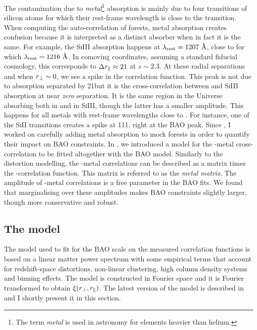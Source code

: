 The contamination due to \emph{metal}\footnote{The term \emph{metal} is used in 
astronomy for elements heavier than helium.} 
absorption is mainly due to four transitions of silicon atoms for which their 
rest-frame wavelength is close to the \lya transition. When computing the 
auto-correlation of forests, metal absorption creates confusion because 
it is interpreted as a distinct \lya absorber when in fact it is the same. 
For example, the \textsc{SiIII} absorption happens at 
$\lambda_\mathrm{rest} = 1207~\angstrom$, close to \lya for which $\lambda_\mathrm{rest} = 1216~\angstrom$. 
In comoving coordinates, assuming a standard fiducial cosmology, this corresponds
to $\Delta {r_\parallel} \approx 21$\hmpc 
at $z \sim 2.3$. At these radial separations and when ${r_\perp} \sim 0$, we see a 
spike in the correlation function. This peak is not due to \lya absorption 
separated by 21\hmpc but it is the cross-correlation between \lya and \textsc{SiIII}
absorption at near \emph{zero} separation. It is the same region in the 
Universe absorbing both in \lya and in \textsc{SiIII}, though the latter 
has a smaller amplitude. This happens for all metals with rest-frame 
wavelengths close to \lya. For instance, one of the \textsc{SiII} transitions 
creates a spike at 111\hmpc, right at the BAO peak. 
Since \cite{delubacBaryonAcousticOscillations2015}, I worked on carefully 
adding metal absorption to mock forests in order to quantify their impact on 
BAO constraints. In \cite{bautistaMeasurementBaryonAcoustic2017}, we introduced 
a model for the \lya-metal cross-correlation to be fitted altogether with the 
BAO model. Similarly to the distortion modelling, the \lya-metal correlations 
can be described as a matrix times the \lya-\lya correlation function. 
This matrix is referred to as the \emph{metal matrix}. The amplitude of 
\lya-metal correlations is a free parameter in the BAO fits. 
We found that marginalising over these amplitudes makes BAO constraints 
slightly larger, though more conservative and robust.   

\subsection{The model}
\label{forests:bao:model}

The model used to fit for the BAO scale on the measured correlation functions 
is based on a linear matter power spectrum with some empirical terms 
that account for redshift-space distortions, non-linear clustering, 
high column density systems and binning effects. The model is constructed in 
Fourier space and it is Fourier transformed to obtain $\xi({r_\perp}, {r_\parallel})$. 
The latest version of the model is described in \cite{dumasdesbourbouxhelionCompletedSDSSIVExtended2020}
and I shortly present it in this section. 

